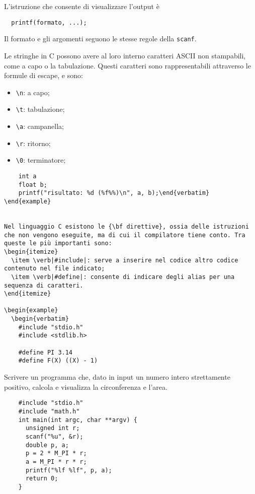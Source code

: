 L'istruzione che consente di visualizzare l'output è
\begin{verbatim}
  printf(formato, ...);
\end{verbatim}
Il formato e gli argomenti seguono le stesse regole della \verb|scanf|.

Le stringhe in C possono avere al loro interno caratteri ASCII non stampabili, come a capo o la tabulazione. Questi caratteri sono rappresentabili attraverso le formule di escape, e sono:
\begin{itemize}
  \item \verb|\n|: a capo;
  \item \verb|\t|: tabulazione;
  \item \verb|\a|: campanella;
  \item \verb|\r|: ritorno;
  \item \verb|\0|: terminatore;
\end{itemize}

\begin{example}
  \begin{verbatim}
    int a
    float b;
    printf("risultato: %d (%f%%)\n", a, b);\end{verbatim}
\end{example}


Nel linguaggio C esistono le {\bf direttive}, ossia delle istruzioni che non vengono eseguite, ma di cui il compilatore tiene conto. Tra queste le più importanti sono:
\begin{itemize}
  \item \verb|#include|: serve a inserire nel codice altro codice contenuto nel file indicato;
  \item \verb|#define|: consente di indicare degli alias per una sequenza di caratteri.
\end{itemize}

\begin{example}
  \begin{verbatim}
    #include "stdio.h"
    #include <stdlib.h>
    
    #define PI 3.14
    #define F(X) ((X) - 1)\end{verbatim}
\end{example}

\begin{example}
  Scrivere un programma che, dato in input un numero intero strettamente positivo, calcola e visualizza la circonferenza e l'area.
  \begin{verbatim}
    #include "stdio.h"
    #include "math.h"
    int main(int argc, char **argv) {
      unsigned int r;
      scanf("%u", &r);
      double p, a;
      p = 2 * M_PI * r;
      a = M_PI * r * r;
      printf("%lf %lf", p, a);
      return 0;
    }\end{verbatim}
\end{example}


